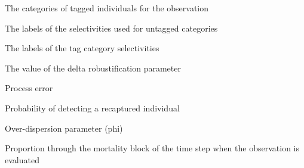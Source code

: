  {The categories of tagged individuals for the observation}

 {The labels of the selectivities used for untagged categories}

 {The labels of the tag category selectivities}

 {The value of the delta robustification parameter}

 {Process error}

 {Probability of detecting a recaptured individual}

 {Over-dispersion parameter (phi)}

 {Proportion through the mortality block of the time step when the observation is evaluated}

